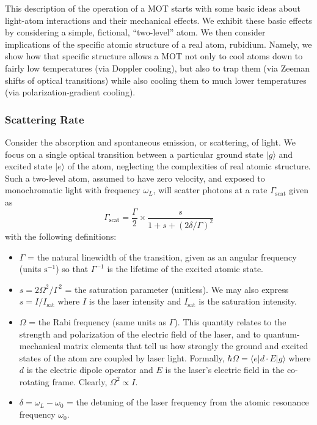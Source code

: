 \documentclass{../lab}
\begin{document}
This description of the operation of a MOT starts with some basic ideas about light-atom interactions and their mechanical effects. We exhibit these basic effects by considering a simple, fictional, ``two-level'' atom. We then consider implications of the specific atomic structure of a real atom, rubidium. Namely, we show how that specific structure allows a MOT not only to cool atoms down to fairly low temperatures (via Doppler cooling), but also to trap them (via Zeeman shifts of optical transitions) while also cooling them to much lower temperatures (via polarization-gradient cooling).

\subsubsection{Scattering Rate}

Consider the absorption and spontaneous emission, or scattering, of light. We focus on a single optical transition between a particular ground state $|g\rangle$ and excited state $|e\rangle$ of the atom, neglecting the complexities of real atomic structure. Such a two-level atom, assumed to have zero velocity, and exposed to monochromatic light with frequency $\omega_L$, will scatter photons at a rate $\Gamma_\text{scat}$ given as
\begin{equation}
    \Gamma_\text{scat} = \frac{\Gamma}{2} \times \frac{s}{1 + s + (2\delta/\Gamma)^2}
\end{equation}
with the following definitions:

\begin{itemize}
    \item $\Gamma$ = the natural linewidth of the transition, given as an angular frequency (units $\mbox{s}^{-1}$) so that $\Gamma^{-1}$ is the lifetime of the excited atomic state.

    \item $s = 2\Omega^2/\Gamma^2$ = the saturation parameter (unitless). We may also express $s = I/I_\text{sat}$ where $I$ is the laser intensity and $I_\text{sat}$ is the saturation intensity.

    \item $\Omega$ = the Rabi frequency (same units as $\Gamma$). This quantity relates to the strength and polarization of the electric field of the laser, and to quantum-mechanical matrix elements that tell us how strongly the ground and excited states of the atom are coupled by laser light. Formally, $\hbar\Omega =  \langle e|d\cdot E|g\rangle$ where $d$ is the electric dipole operator and $ E$ is the laser's electric field in the co-rotating frame. Clearly, $\Omega^2 \propto  I$.

    \item $\delta = \omega_L - \omega_0$ = the detuning of the laser frequency from the atomic resonance frequency $\omega_0$.
\end{itemize}
\end{document}
